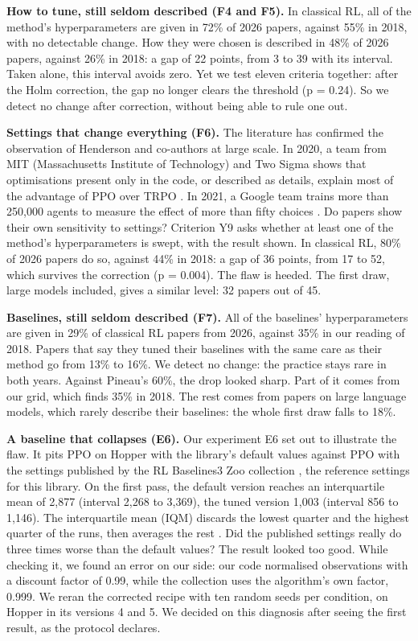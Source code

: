 \documentclass[11pt,a4paper]{article}
\begin{document}
\textbf{How to tune, still seldom described (F4 and F5).} In classical
RL, all of the method's hyperparameters are given in 72\% of 2026
papers, against 55\% in 2018, with no detectable change. How they were
chosen is described in 48\% of 2026 papers, against 26\% in 2018: a gap
of 22 points, from 3 to 39 with its interval. Taken alone, this interval
avoids zero. Yet we test eleven criteria together: after the Holm
correction, the gap no longer clears the threshold (p = 0.24). So we
detect no change after correction, without being able to rule one out.

\textbf{Settings that change everything (F6).} The literature has
confirmed the observation of Henderson and co-authors at large scale. In
2020, a team from MIT (Massachusetts Institute of Technology) and Two
Sigma shows that optimisations present only in the code, or described as
details, explain most of the advantage of PPO over TRPO
\autocite{engstrom2020implementation}. In 2021, a Google team trains
more than 250,000 agents to measure the effect of more than fifty
choices \autocite{andrychowicz2021matters}. Do papers show their own
sensitivity to settings? Criterion Y9 asks whether at least one of the
method's hyperparameters is swept, with the result shown. In classical
RL, 80\% of 2026 papers do so, against 44\% in 2018: a gap of 36 points,
from 17 to 52, which survives the correction (p = 0.004). The flaw is
heeded. The first draw, large models included, gives a similar level: 32
papers out of 45.

\textbf{Baselines, still seldom described (F7).} All of the baselines'
hyperparameters are given in 29\% of classical RL papers from 2026,
against 35\% in our reading of 2018. Papers that say they tuned their
baselines with the same care as their method go from 13\% to 16\%. We
detect no change: the practice stays rare in both years. Against
Pineau's 60\%, the drop looked sharp. Part of it comes from our grid,
which finds 35\% in 2018. The rest comes from papers on large language
models, which rarely describe their baselines: the whole first draw
falls to 18\%.

\textbf{A baseline that collapses (E6).} Our experiment E6 set out to
illustrate the flaw. It pits PPO on Hopper with the library's default
values against PPO with the settings published by the RL Baselines3 Zoo
collection \autocite{raffin2020zoo}, the reference settings for this
library. On the first pass, the default version reaches an interquartile
mean of 2,877 (interval 2,268 to 3,369), the tuned version 1,003
(interval 856 to 1,146). The interquartile mean (IQM) discards the
lowest quarter and the highest quarter of the runs, then averages the
rest \autocite{agarwal2021precipice}. Did the published settings really
do three times worse than the default values? The result looked too
good. While checking it, we found an error on our side: our code
normalised observations with a discount factor of 0.99, while the
collection uses the algorithm's own factor, 0.999. We reran the
corrected recipe with ten random seeds per condition, on Hopper in its
versions 4 and 5. We decided on this diagnosis after seeing the first
result, as the protocol declares.
\end{document}
